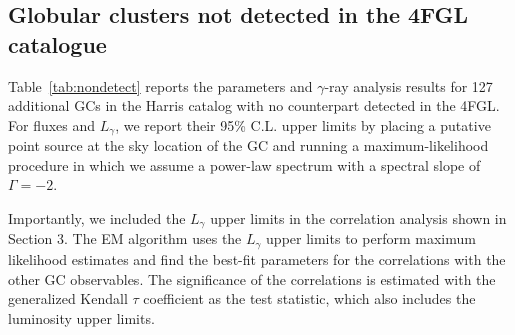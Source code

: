 \documentclass[doublespace,nopageskip]{VTthesis} %
\begin{document}
\appendix

\begin{appendices}

  
  \chapter{} \label{app:A}

  \section{Globular clusters not detected in the 4FGL catalogue}\label{appx:nodetect}

  Table~\ref{tab:nondetect} reports the parameters and $\gamma$-ray analysis results for 127 additional GCs in the Harris catalog with no counterpart detected in the 4FGL. For fluxes and $L_\gamma$, we report their 95\% C.L. upper limits by placing a putative point source at the sky location of the GC and running a maximum-likelihood procedure in which we assume a power-law spectrum with a spectral slope of $\Gamma = -2$.

  Importantly, we included the $L_\gamma$ upper limits in the correlation analysis shown in Section 3. The EM algorithm uses the $L_\gamma$ upper limits to perform maximum likelihood estimates and find the best-fit parameters for the correlations with the other GC observables. The significance of the correlations is estimated with the generalized Kendall $\tau$ coefficient as the test statistic, which also includes the luminosity upper limits. 


\end{appendices}
\end{document}
